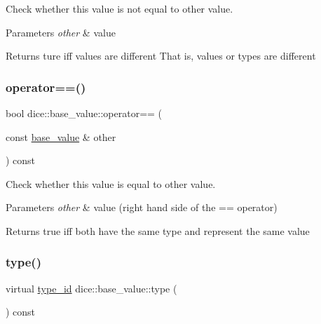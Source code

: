Check whether this value is not equal to other value. 


\begin{DoxyParams}{Parameters}
{\em other} & value\\
\hline
\end{DoxyParams}
\begin{DoxyReturn}{Returns}
ture iff values are different That is, values or types are different 
\end{DoxyReturn}
\mbox{\label{classdice_1_1base__value_a5939b300dd577d307cf94d3a6d726210}} 
\subsubsection{\texorpdfstring{operator==()}{operator==()}}
{\footnotesize\ttfamily bool dice\+::base\+\_\+value\+::operator== (\begin{DoxyParamCaption}\item[{const \mbox{\hyperlink{classdice_1_1base__value}{base\+\_\+value}} \&}]{other }\end{DoxyParamCaption}) const\hspace{0.3cm}{\ttfamily [inline]}}



Check whether this value is equal to other value. 


\begin{DoxyParams}{Parameters}
{\em other} & value (right hand side of the == operator)\\
\hline
\end{DoxyParams}
\begin{DoxyReturn}{Returns}
true iff both have the same type and represent the same value 
\end{DoxyReturn}
\mbox{\label{classdice_1_1base__value_a5125d076b0ed6a398f4f4f8fe19ef60b}} 
\subsubsection{\texorpdfstring{type()}{type()}}
{\footnotesize\ttfamily virtual \mbox{\hyperlink{value_8hpp_ab9af7d8ecc381e026ca4d07a745f23eb}{type\+\_\+id}} dice\+::base\+\_\+value\+::type (\begin{DoxyParamCaption}{ }\end{DoxyParamCaption}) const\hspace{0.3cm}{\ttfamily [pure virtual]}}




